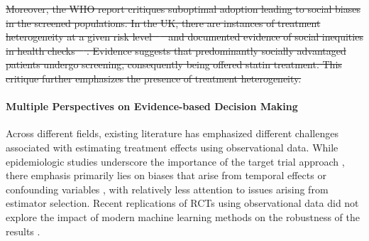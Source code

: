 \documentclass[10pt,letterpaper]{article}
\providecommand{\DIFdeltex}[1]{{\protect\color{red}\sout{#1}}}                      %
\providecommand{\DIFdelbegin}{} %
\providecommand{\DIFdelend}{} %
\providecommand{\DIFdel}[1]{\texorpdfstring{\DIFdeltex{#1}}{}} %
\newcommand{\DIFscaledelfig}{0.5}
\newlength{\DIFdelgraphicswidth} %
\newlength{\DIFdelgraphicsheight} %
\newcommand{\DIFdelincludegraphics}[2][]{%
\sbox{\DIFdelgraphicsbox}{\DIFOincludegraphics[#1]{#2}}%
\settoboxwidth{\DIFdelgraphicswidth}{\DIFdelgraphicsbox} %
\settoboxtotalheight{\DIFdelgraphicsheight}{\DIFdelgraphicsbox} %
\scalebox{\DIFscaledelfig}{%
\parbox[b]{\DIFdelgraphicswidth}{\usebox{\DIFdelgraphicsbox}\\[-\baselineskip] \rule{\DIFdelgraphicswidth}{0em}}\llap{\resizebox{\DIFdelgraphicswidth}{\DIFdelgraphicsheight}{%
\setlength{\unitlength}{\DIFdelgraphicswidth}%
\begin{picture}(1,1)%
\thicklines\linethickness{2pt} %
{\color[rgb]{1,0,0}\put(0,0){\framebox(1,1){}}}%
{\color[rgb]{1,0,0}\put(0,0){\line( 1,1){1}}}%
{\color[rgb]{1,0,0}\put(0,1){\line(1,-1){1}}}%
\end{picture}%
}\hspace*{3pt}}} %
} %
\DeclareRobustCommand{\DIFdelbegin}{\DIFOdelbegin \let\includegraphics\DIFdelincludegraphics} %
\DeclareRobustCommand{\DIFdelend}{\DIFOaddend \let\includegraphics\DIFOincludegraphics} %
\begin{document}
\DIFdelbegin \DIFdel{Moreover, the WHO report critiques suboptimal adoption leading to social biases in the screened populations. In the UK, there are instances of treatment heterogeneity at a given risk level \mbox{%
\cite{van2013efficiency} }\hskip0pt%
and documented evidence of social inequities in health checks \mbox{%
\cite{krska2016implementation}}\hskip0pt%
. Evidence suggests that predominantly socially advantaged patients undergo screening, consequently being offered statin treatment. This critique further emphasizes the presence of treatment heterogeneity.
}\DIFdelend %

\paragraph{Multiple Perspectives on Evidence-based Decision Making}
Across different fields, existing literature has emphasized different challenges associated
with estimating treatment effects using observational data. While epidemiologic
studies underscore the importance of the target trial approach
\cite{von2007strengthening,benchimol2015reporting,hernan2020causal,schneeweiss2021conducting,zeng2022uncovering},
there emphasis primarily lies on biases that arise from temporal effects \cite{suissa2008immortal,Oke2021leadtimebias,fu2021timing,hernan2016specifying,wang2022understanding,Bankhead2017attritionbias} or confounding variables \cite{greenland1999causal,vanderweele2019principles,loh2021confounder}, with
relatively less attention to issues arising from estimator selection.
Recent replications of RCTs using observational data did not explore the impact
of modern machine learning methods on the robustness of the results
\cite{schneeweiss2021conducting,wang2023emulation}.
\end{document}
